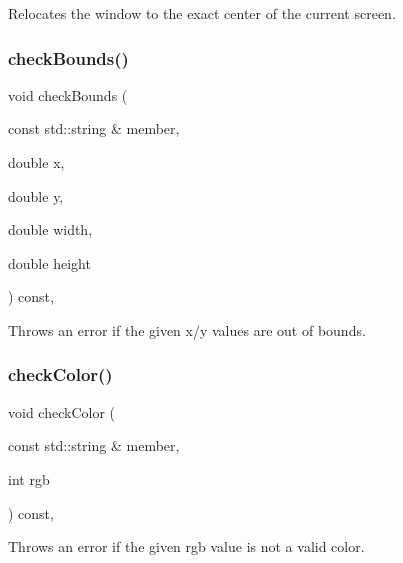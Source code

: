 Relocates the window to the exact center of the current screen. 

\mbox{\label{classGDrawingSurface_a3a690bcb2d62250c9e4722ad7c1b9ab6}} 
\subsubsection{\texorpdfstring{check\+Bounds()}{checkBounds()}}
{\footnotesize\ttfamily void check\+Bounds (\begin{DoxyParamCaption}\item[{const std\+::string \&}]{member,  }\item[{double}]{x,  }\item[{double}]{y,  }\item[{double}]{width,  }\item[{double}]{height }\end{DoxyParamCaption}) const\hspace{0.3cm}{\ttfamily [protected]}, {\ttfamily [inherited]}}



Throws an error if the given x/y values are out of bounds. 

\mbox{\label{classGDrawingSurface_a9841b5dc607ca41a14819d80e1d8a09c}} 
\subsubsection{\texorpdfstring{check\+Color()}{checkColor()}}
{\footnotesize\ttfamily void check\+Color (\begin{DoxyParamCaption}\item[{const std\+::string \&}]{member,  }\item[{int}]{rgb }\end{DoxyParamCaption}) const\hspace{0.3cm}{\ttfamily [protected]}, {\ttfamily [inherited]}}



Throws an error if the given rgb value is not a valid color. 

\mbox{\label{classGDrawingSurface_a70a6546707ae708573396616bd0f5320}} 
